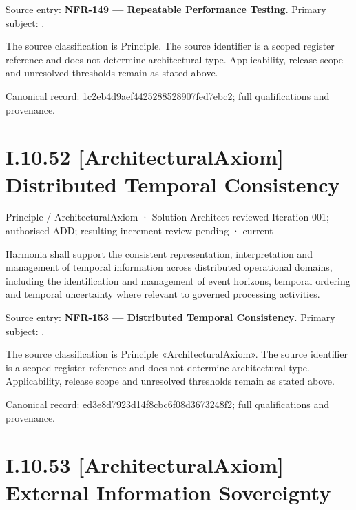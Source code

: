 Source entry: \textbf{NFR-149 — Repeatable Performance Testing}. Primary subject: \texttt{}.



The source classification is Principle. The source identifier is a scoped register reference and does not determine architectural type. Applicability, release scope and unresolved thresholds remain as stated above.


{\footnotesize \href{../../../../../../../../continuum/motivation/principle/1c2eb4d9aef4425288528907fed7ebc2.md}{Canonical record: 1c2eb4d9aef4425288528907fed7ebc2}; full qualifications and provenance.}\par
\section*{I.10.52 [ArchitecturalAxiom] Distributed Temporal Consistency}
\label{navigation:I.10.52}

\label{element:ed3e8d7923d14f8cbc6f08d3673248f2}
{\small Principle / ArchitecturalAxiom · Solution Architect-reviewed Iteration 001; authorised ADD; resulting increment review pending · current}\par

Harmonia shall support the consistent representation, interpretation and management of temporal information across distributed operational domains, including the identification and management of event horizons, temporal ordering and temporal uncertainty where relevant to governed processing activities.



Source entry: \textbf{NFR-153 — Distributed Temporal Consistency}. Primary subject: \texttt{}.



The source classification is Principle «ArchitecturalAxiom». The source identifier is a scoped register reference and does not determine architectural type. Applicability, release scope and unresolved thresholds remain as stated above.


{\footnotesize \href{../../../../../../../../continuum/motivation/principle/architectural-axiom/ed3e8d7923d14f8cbc6f08d3673248f2.md}{Canonical record: ed3e8d7923d14f8cbc6f08d3673248f2}; full qualifications and provenance.}\par
\section*{I.10.53 [ArchitecturalAxiom] External Information Sovereignty}
\label{navigation:I.10.53}

